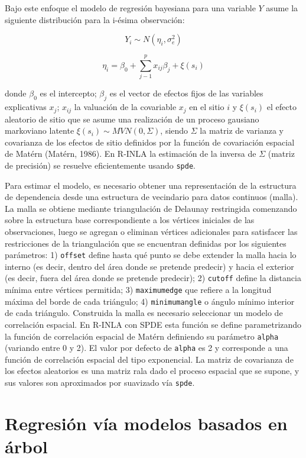 \documentclass[11pt,b5paper,]{krantz}
\begin{document}
Bajo este enfoque el modelo de regresión bayesiana para una variable
\(Y\) asume la siguiente distribución para la i-ésima observación:

\[Y_i\sim N(\eta_i,\sigma_e^2)\]

\[\eta_i = \beta_0 + \sum_{j-1}^{p} {x_{ij}\beta_j}+ \xi(s_i)\]

donde \(\beta_0\) es el intercepto; \(\beta_j\) es el vector de efectos
fijos de las variables explicativas \(x_j\); \(x_{ij}\) la valuación de
la covariable \(x_j\) en el sitio \(i\) y \(\xi(s_i)\) el efecto
aleatorio de sitio que se asume una realización de un proceso gausiano
markoviano latente \(\xi(s_i) \sim MVN(0,\Sigma)\), siendo \(\Sigma\) la
matriz de varianza y covarianza de los efectos de sitio definidos por la
función de covariación espacial de Matérn (Matérn, 1986). En R-INLA la
estimación de la inversa de \(\Sigma\) (matriz de precisión) se resuelve
eficientemente usando \texttt{spde}.

Para estimar el modelo, es necesario obtener una representación de la
estructura de dependencia desde una estructura de vecindario para datos
continuos (malla). La malla se obtiene mediante triangulación de
Delaunay restringida comenzando sobre la estructura base correspondiente
a los vértices iniciales de las observaciones, luego se agregan o
eliminan vértices adicionales para satisfacer las restricciones de la
triangulación que se encuentran definidas por los siguientes parámetros:
1) \texttt{offset} define hasta qué punto se debe extender la malla
hacia lo interno (es decir, dentro del área donde se pretende predecir)
y hacia el exterior (es decir, fuera del área donde se pretende
predecir); 2) \texttt{cutoff} define la distancia mínima entre vértices
permitida; 3) \texttt{maximumedge} que refiere a la longitud máxima del
borde de cada triángulo; 4) \texttt{minimumangle} o ángulo mínimo
interior de cada triángulo. Construida la malla es necesario seleccionar
un modelo de correlación espacial. En R-INLA con SPDE esta función se
define parametrizando la función de correlación espacial de Matérn
definiendo su parámetro \texttt{alpha} (variando entre 0 y 2). El valor
por defecto de \texttt{alpha} es 2 y corresponde a una función de
correlación espacial del tipo exponencial. La matriz de covarianza de
los efectos aleatorios es una matriz rala dado el proceso espacial que
se supone, y sus valores son aproximados por suavizado vía
\texttt{spde}.

\section{Regresión vía modelos basados en
árbol}\label{regresiuxf3n-vuxeda-modelos-basados-en-uxe1rbol}
\end{document}
